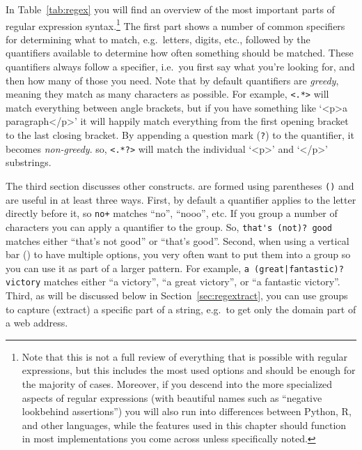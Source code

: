 In Table~\ref{tab:regex} you will find an overview of the most important parts of regular expression syntax.\footnote{
  Note that this is not a full review of everything that is possible with regular expressions, but this includes the most used options and should be enough for the majority of cases. Moreover, if you descend into the more specialized aspects of regular expressions (with beautiful names such as ``negative lookbehind assertions'') you will also run into differences between Python, R, and other languages, while the features used in this chapter should function in most implementations you come across unless specifically noted.
}
 The first part shows a number of common specifiers for determining what to match, e.g.\ letters, digits, etc.,
followed by the quantifiers available to determine how often something should be matched.
These quantifiers always follow a specifier, i.e.\ you first say what you're looking for, and then how many of those you need.
Note that by default quantifiers are \emph{greedy}, meaning they match as many characters as possible.
For example, \verb|<.*>| will match everything between angle brackets, but if you have something like `<p>a paragraph</p>'
it will happily match everything from the first opening bracket to the last closing bracket.
By appending a question mark (\verb|?|) to the quantifier, it becomes \emph{non-greedy}.
so, \verb|<.*?>| will match the individual `<p>' and `</p>' substrings.

The third section discusses other constructs.
 are formed using parentheses \verb|()| and are useful in at least three ways.
First, by default a quantifier applies to the letter directly before it, so \verb|no+| matches ``no'', ``nooo'', etc.
If you group a number of characters you can apply a quantifier to the group. So, \verb|that's (not)? good| matches either ``that's not good'' or 	``that's good''.
Second, when using a vertical bar (\textbar) to have multiple options, you very often want to put them into a group so you can use it as part of a larger pattern.
For example, \verb+a (great|fantastic)? victory+ matches either ``a victory'', ``a great victory'', or ``a fantastic victory''.
Third, as will be discussed below in Section~\ref{sec:regextract}, you can use groups to capture (extract) a specific part of a string, e.g.\ to get only the domain part of a web address.


